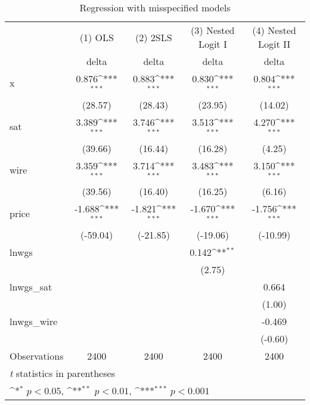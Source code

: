 
\begin{table}[htbp]\centering
	\def\sym#1{\ifmmode^{#1}\else\(^{#1}\)\fi}
	\caption{Regression with misspecified models\label{tab1}}
	\begin{tabular}{l*{4}{c}}
		\hline\hline
		&\multicolumn{1}{c}{(1) OLS}&\multicolumn{1}{c}{(2) 2SLS}&\multicolumn{1}{c}{(3) Nested Logit I}&\multicolumn{1}{c}{(4) Nested Logit II}\\
		&\multicolumn{1}{c}{delta}&\multicolumn{1}{c}{delta}&\multicolumn{1}{c}{delta}&\multicolumn{1}{c}{delta}\\
		\hline
		x                   &       0.876\sym{***}&       0.883\sym{***}&       0.830\sym{***}&       0.804\sym{***}\\
		&     (28.57)         &     (28.43)         &     (23.95)         &     (14.02)         \\
		[1em]
		sat                 &       3.389\sym{***}&       3.746\sym{***}&       3.513\sym{***}&       4.270\sym{***}\\
		&     (39.66)         &     (16.44)         &     (16.28)         &      (4.25)         \\
		[1em]
		wire                &       3.359\sym{***}&       3.714\sym{***}&       3.483\sym{***}&       3.150\sym{***}\\
		&     (39.56)         &     (16.40)         &     (16.25)         &      (6.16)         \\
		[1em]
		price               &      -1.688\sym{***}&      -1.821\sym{***}&      -1.670\sym{***}&      -1.756\sym{***}\\
		&    (-59.04)         &    (-21.85)         &    (-19.06)         &    (-10.99)         \\
		[1em]
		lnwgs               &                     &                     &       0.142\sym{**} &                     \\
		&                     &                     &      (2.75)         &                     \\
		[1em]
		lnwgs\_sat           &                     &                     &                     &       0.664         \\
		&                     &                     &                     &      (1.00)         \\
		[1em]
		lnwgs\_wire          &                     &                     &                     &      -0.469         \\
		&                     &                     &                     &     (-0.60)         \\
		\hline
		Observations        &        2400         &        2400         &        2400         &        2400         \\
		\hline\hline
		\multicolumn{5}{l}{\footnotesize \textit{t} statistics in parentheses}\\
		\multicolumn{5}{l}{\footnotesize \sym{*} \(p<0.05\), \sym{**} \(p<0.01\), \sym{***} \(p<0.001\)}\\
	\end{tabular}
\end{table}

